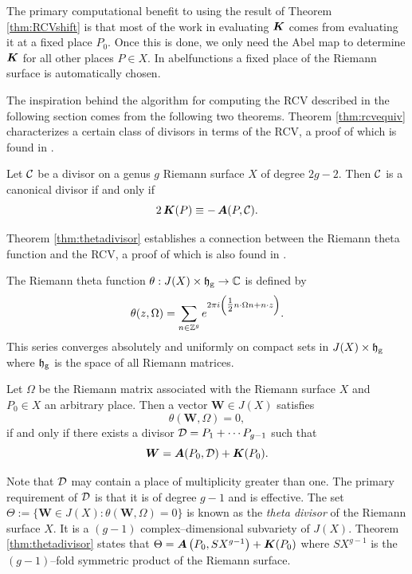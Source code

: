 The primary computational benefit to using the result of Theorem
\ref{thm:RCVshift} is that most of the work in evaluating $\operatorname{\boldsymbol{K}}$ comes
from evaluating it at a fixed place $P_0$. Once this is done, we only
need the Abel map to determine $\operatorname{\boldsymbol{K}}$ for all other places $P \in X$. In
{\sc abelfunctions} a fixed place of the Riemann surface is
automatically chosen.

The inspiration behind the algorithm for computing the RCV described in
the following section comes from the following two theorems. Theorem
\ref{thm:rcvequiv} characterizes a certain class of divisors in terms of
the RCV, a proof of which is found in \cite{FarkasKra92}.
\begin{theorem} \label{thm:rcvequiv}
  Let $\operatorname{\mathcal{C}}$ be a divisor on a genus $g$ Riemann surface $X$ of degree
  $2g - 2$. Then $\operatorname{\mathcal{C}}$ is a canonical divisor if and only if
  \begin{equation} \label{eqn:rcvequiv}
    2\operatorname{\boldsymbol{K}}(P) \equiv -\operatorname{\boldsymbol{A}}(P,\operatorname{\mathcal{C}}).
  \end{equation}
\end{theorem}
\noindent Theorem \ref{thm:thetadivisor} establishes a connection
between the Riemann theta function and the RCV, a proof of which is also
found in \cite{FarkasKra92}.
\begin{definition} \label{def:riemanntheta}
  The Riemann theta function $\theta: J(X) \times \operatorname{\mathfrak{h}_g} \to \operatorname{\mathbb{C}}$ is
  defined by
  \begin{equation} \label{eqn:riemanntheta}
    \theta(z,\Omega)
    =
    \sum_{n \in \operatorname{\mathbb{Z}}^g}
    e^{2 \pi i \left( \tfrac{1}{2} n \cdot \Omega n + n \cdot z \right)}.
  \end{equation}
  This series converges absolutely and uniformly on compact sets in
  $J(X) \times \operatorname{\mathfrak{h}_g}$ where $\operatorname{\mathfrak{h}_g}$ is the space of all Riemann matrices.
\end{definition}

\begin{theorem} \label{thm:thetadivisor}
  Let $\Omega$ be the Riemann matrix associated with the Riemann surface
  $X$ and $P_0 \in X$ an arbitrary place. Then a vector $\boldsymbol{W}
  \in J(X)$ satisfies
  \begin{equation} \label{eqn:thetadivisor1}
    \theta(\boldsymbol{W}, \Omega) = 0,
  \end{equation}
  if and only if there exists a divisor $\operatorname{\mathcal{D}} = P_1 + \cdots P_{g-1}$
  such that
  \begin{equation} \label{eqn:thetadivisor2}
    \boldsymbol{W} = \boldsymbol{A}(P_0, \operatorname{\mathcal{D}}) + \boldsymbol{K}(P_0).
  \end{equation}
\end{theorem}
Note that $\operatorname{\mathcal{D}}$ may contain a place of multiplicity greater than
one. The primary requirement of $\operatorname{\mathcal{D}}$ is that it is of degree $g-1$
and is effective. The set $\Theta := \{ \boldsymbol{W} \in J(X) :
\theta(\boldsymbol{W},\Omega) = 0\}$ is known as the {\it theta divisor}
of the Riemann surface $X$. It is a $(g-1)$ complex--dimensional
subvariety of $J(X)$. Theorem \ref{thm:thetadivisor} states that $\Theta
= \operatorname{\boldsymbol{A}}\left(P_0,SX^{g-1}\right) + \boldsymbol{K}(P_0)$ where $SX^{g-1}$
is the $(g-1)$--fold symmetric product of the Riemann surface.


